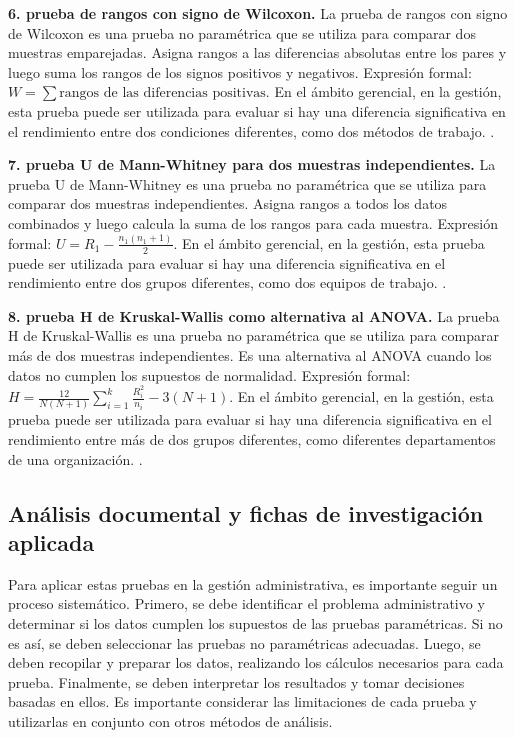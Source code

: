 {\textbf{6. prueba de rangos con signo de Wilcoxon.} La prueba de rangos con signo de Wilcoxon es una prueba no paramétrica que se utiliza para comparar dos muestras emparejadas. Asigna rangos a las diferencias absolutas entre los pares y luego suma los rangos de los signos positivos y negativos. Expresión formal: $W = \sum \text{rangos de las diferencias positivas}$. En el ámbito gerencial, en la gestión, esta prueba puede ser utilizada para evaluar si hay una diferencia significativa en el rendimiento entre dos condiciones diferentes, como dos métodos de trabajo. \citep{anderson2012,lind2012,wackerly2010}.

\textbf{7. prueba U de Mann-Whitney para dos muestras independientes.} La prueba U de Mann-Whitney es una prueba no paramétrica que se utiliza para comparar dos muestras independientes. Asigna rangos a todos los datos combinados y luego calcula la suma de los rangos para cada muestra. Expresión formal: $U = R_1 - \frac{n_1(n_1 + 1)}{2}$. En el ámbito gerencial, en la gestión, esta prueba puede ser utilizada para evaluar si hay una diferencia significativa en el rendimiento entre dos grupos diferentes, como dos equipos de trabajo. \citep{anderson2012,lind2012,wackerly2010}.

\textbf{8. prueba H de Kruskal-Wallis como alternativa al ANOVA.} La prueba H de Kruskal-Wallis es una prueba no paramétrica que se utiliza para comparar más de dos muestras independientes. Es una alternativa al ANOVA cuando los datos no cumplen los supuestos de normalidad. Expresión formal: $H = \frac{12}{N(N+1)} \sum_{i=1}^{k} \frac{R_i^2}{n_i} - 3(N+1)$. En el ámbito gerencial, en la gestión, esta prueba puede ser utilizada para evaluar si hay una diferencia significativa en el rendimiento entre más de dos grupos diferentes, como diferentes departamentos de una organización. \citep{anderson2012,lind2012,wackerly2010}.


\subsection{Análisis documental y fichas de investigación aplicada}
Para aplicar estas pruebas en la gestión administrativa, es importante seguir un proceso sistemático. Primero, se debe identificar el problema administrativo y determinar si los datos cumplen los supuestos de las pruebas paramétricas. Si no es así, se deben seleccionar las pruebas no paramétricas adecuadas. Luego, se deben recopilar y preparar los datos, realizando los cálculos necesarios para cada prueba. Finalmente, se deben interpretar los resultados y tomar decisiones basadas en ellos. Es importante considerar las limitaciones de cada prueba y utilizarlas en conjunto con otros métodos de análisis.

}
